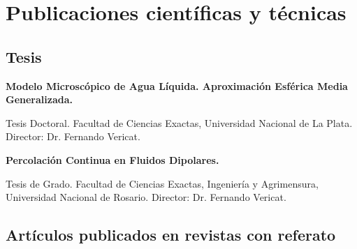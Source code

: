 
\section{Publicaciones científicas y técnicas}

\subsection{Tesis}
\begin{timeline}
 \textbf{Modelo Microscópico de Agua Líquida. Aproximación Esférica Media Generalizada.}

Tesis Doctoral. Facultad de Ciencias Exactas, Universidad Nacional de La Plata. Director: Dr. Fernando Vericat.


 \textbf{Percolación Continua en Fluidos Dipolares.}

Tesis de Grado. Facultad de Ciencias Exactas, Ingeniería y Agrimensura, Universidad Nacional de Rosario. Director: Dr. Fernando Vericat.
\end{timeline}

\subsection{Artículos publicados en revistas con referato}


\begin{ntimeline}
  
\end{ntimeline}


